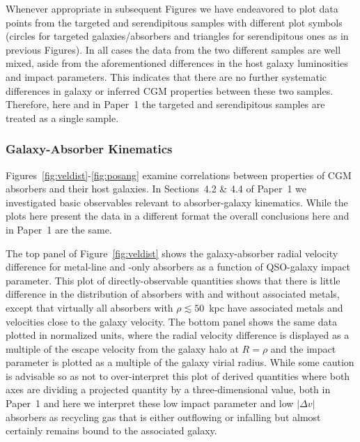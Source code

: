 \documentclass[twocolumn,twocolappendix,tighten,times]{aastex6}
\newcommand{\HI}{\ion{H}{1}}
\begin{document}

Whenever appropriate in subsequent Figures we have endeavored to plot data points 
from the targeted and serendipitous samples with different plot symbols (circles 
for targeted galaxies/absorbers and triangles for serendipitous ones as in 
previous Figures). In all cases the data from the two different samples are well 
mixed, aside from the aforementioned differences in the host galaxy luminosities 
and impact parameters. This indicates that there are no further systematic 
differences in galaxy or inferred CGM properties between these two samples. 
Therefore, here and in Paper~1 the targeted and serendipitous samples are treated 
as a single sample.


\subsubsection{Galaxy-Absorber Kinematics}
\label{discussion:correlations:kinematics}

Figures~\ref{fig:veldist}-\ref{fig:posang} examine correlations between properties 
of CGM absorbers and their host galaxies. In Sections~4.2 \& 4.4 of Paper~1 we 
investigated basic observables relevant to absorber-galaxy kinematics. While the 
plots here present the data in a different format the overall conclusions here 
and in Paper~1 are the same.

The top panel of Figure~\ref{fig:veldist} shows the galaxy-absorber radial 
velocity difference for metal-line and \HI-only absorbers as a function of 
QSO-galaxy impact parameter. This plot of directly-observable quantities 
shows that there is little difference in the distribution of absorbers with and 
without associated metals, except that virtually all absorbers with 
$\rho \lesssim 50$~kpc have associated metals and velocities close to 
the galaxy velocity. The bottom panel shows the same data plotted in normalized 
units, where the radial velocity difference is displayed as a multiple of 
the escape velocity from the galaxy halo at $R=\rho$ and the impact parameter is 
plotted as a multiple of the galaxy virial radius. While some caution is advisable 
so as not to over-interpret this plot of derived quantities where both axes are 
dividing a projected quantity by a three-dimensional value, both in Paper~1 and 
here we interpret these low impact parameter and low $|\Delta v|$ absorbers 
as recycling gas that is either outflowing or infalling but almost certainly 
remains bound to the associated galaxy. 
\end{document}
